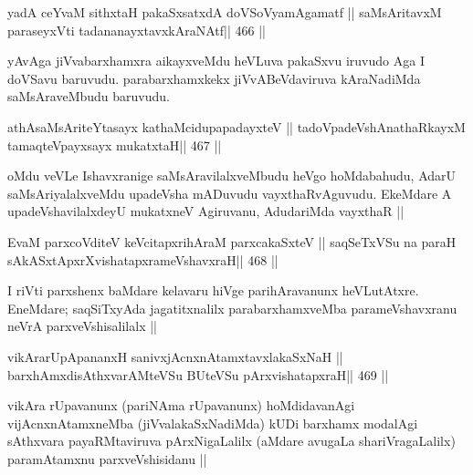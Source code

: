 \begin{shl}
yadA ceYvaM sithxtaH pakaSxsatxdA doVSoV\s yamAgamatf ||
saMsAritavxM paraseyxVti tadananayxtavxkAraNAtf\hfill || 466 ||
\end{shl}

\begin{artha}
yAvAga jiVvabarxhamxra aikayxveMdu heVLuva pakaSxvu iruvudo Aga I
doVSavu baruvudu. parabarxhamxkekx jiVvABeVdaviruva kAraNadiMda
saMsAraveMbudu baruvudu.
\end{artha}

\begin{shl}
athAsaMsAriteYtasayx kathaMcidupapadayxteV ||
tadoVpadeVshAnathaRkayxM tamaqteV\s payxsayx mukatxtaH\hfill || 467 ||
\end{shl}

\begin{artha}
oMdu veVLe Ishavxranige saMsAravilalxveMbudu heVgo hoMdabahudu, AdarU
saMsAriyalalxveMdu upadeVsha mADuvudu vayxthaRvAguvudu. EkeMdare A
upadeVshavilalxdeyU mukatxneV Agiruvanu, AdudariMda vayxthaR ||
\end{artha}




\begin{shl}
EvaM parxcoVditeV keVcitapxrihAraM parxcakaSxteV ||
saqSeTxVSu na paraH sAkASxtApxrXvishatapxrameVshavxraH\hfill || 468 ||
\end{shl}

\begin{artha}
I riVti parxshenx baMdare kelavaru hiVge parihAravanunx
heVLutAtxre. EneMdare; saqSiTxyAda jagatitxnalilx parabarxhamxveMba
parameVshavxranu neVrA parxveVshisalilalx ||
\end{artha}


\begin{shl}
vikArarUpApananxH sanivxjAcnxnAtamxtavxlakaSxNaH ||
barxhAmxdisAthxvarAMteVSu BUteVSu pArxvishatapxraH\hfill || 469 ||
\end{shl}

\begin{artha}
vikAra rUpavanunx (pariNAma rUpavanunx) hoMdidavanAgi
vijAcnxnAtamxneMba (jiVvalakaSxNadiMda) kUDi barxhamx modalAgi
sAthxvara payaRMtaviruva pArxNigaLalilx (aMdare avugaLa
shariVragaLalilx) paramAtamxnu parxveVshisidanu ||
\end{artha}

